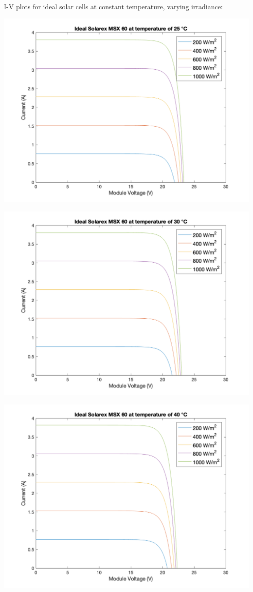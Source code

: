 \documentclass[fleqn]{article}
\begin{document}
\begin{enumerate}
  I-V plots for ideal solar cells at constant temperature, varying irradiance:
  \begin{center}
    \includegraphics[width=0.9\linewidth]{25C-i.png}
  \end{center}
  \begin{center}
    \includegraphics[width=0.9\linewidth]{30C-i.png}
  \end{center}
  \begin{center}
    \includegraphics[width=0.9\linewidth]{40C-i.png}

\end{center}
\end{enumerate}
\end{document}

